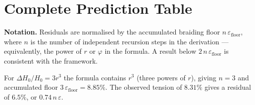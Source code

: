 \documentclass[12pt]{article}
\begin{document}
\section{Complete Prediction Table}

\textbf{Notation.} Residuals are normalised by the accumulated braiding
floor $n\,\varepsilon_{\text{floor}}$, where $n$ is the number of
independent recursion steps in the derivation --- equivalently, the
power of $r$ or $\varphi$ in the formula. A result below
$2\,n\,\varepsilon_{\text{floor}}$ is consistent with the framework.

For $\Delta H_0/H_0 = 3r^3$ the formula contains $r^3$ (three powers of
$r$), giving $n = 3$ and accumulated floor $3\,\varepsilon_{\text{floor}}
= 8.85\%$. The observed tension of $8.31\%$ gives a residual of $6.5\%$,
or $0.74\,n\,\varepsilon$.
\end{document}
